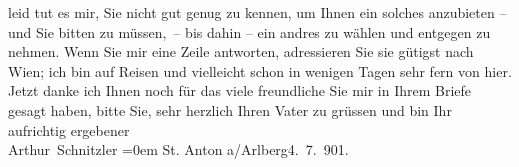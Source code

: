\begin{ledgroupsized}[t]{13cm}
                    leid tut es mir, Sie nicht gut genug zu kennen, um Ihnen ein solches anzubieten
                    – und Sie bitten zu müssen, – bis dahin – ein andres zu wählen und entgegen zu
                    nehmen.\pend
           \pstart
           Wenn Sie mir eine Zeile antworten, adressieren Sie sie gütigst nach Wien; ich bin auf Reisen und vielleicht schon in wenigen
                    Tagen sehr fern von hier.\pend
           \pstart
           Jetzt danke ich Ihnen noch für das viele freundliche \label{T_L01141_1v}\label{T_L01141_1h} Sie mir in Ihrem Briefe gesagt haben,
                    bitte Sie, sehr herzlich Ihren Vater zu grüssen und bin\pend
           \pstart
           Ihr aufrichtig ergebener{\\[\baselineskip]}\spacefill\mbox{Arthur Schnitzler}\pend
           \leftskip=0em{}\pstart
           St. Anton a/Arlberg4. 7. 901.\pend
           
         
         \endnumbering{}\end{ledgroupsized}  \newcommand{\dateiname}{L01141}\newcommand{\titel}{Arthur Schnitzler an Edith Brandes, 4. 7. 1901}\newcommand{\editorInnen}{Martin Anton Müller und Gerd-Hermann Susen}
      